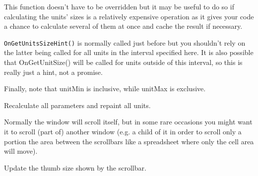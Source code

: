This function doesn't have to be overridden but it may be useful to do so if
calculating the units' sizes is a relatively expensive operation as it gives
your code a chance to calculate several of them at once and cache the result
if necessary.

{\tt OnGetUnitsSizeHint()} is normally called just before
 but you
shouldn't rely on the latter being called for all units in the interval
specified here. It is also possible that OnGetUnitSize() will be called for
units outside of this interval, so this is really just a hint, not a promise.

Finally, note that unitMin is inclusive, while unitMax is exclusive.


\label{wxvarscrollhelperbaserefreshall}


Recalculate all parameters and repaint all units.


\label{wxvarscrollhelperbasesettargetwindow}


Normally the window will scroll itself, but in some rare occasions you might
want it to scroll (part of) another window (e.g. a child of it in order to
scroll only a portion the area between the scrollbars like a spreadsheet where
only the cell area will move).




\label{wxvarscrollhelperbaseupdatescrollbar}


Update the thumb size shown by the scrollbar.

